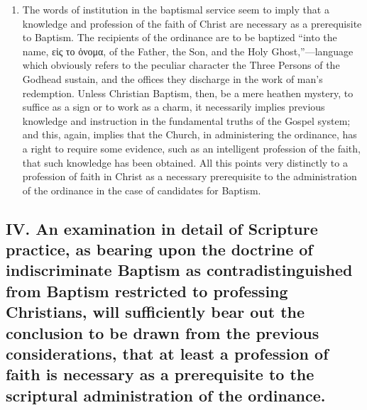 \documentclass[]{book}
\begin{document}
\begin{enumerate}
\item
  The words of institution in the baptismal service seem to imply that a knowledge and profession of the faith of Christ are necessary as a prerequisite to Baptism. The recipients of the ordinance are to be baptized ``into the name, εἰς το ὀνομα, of the Father, the Son, and the Holy Ghost,''---language which obviously refers to the peculiar character the Three Persons of the Godhead sustain, and the offices they discharge in the work of man's redemption. Unless Christian Baptism, then, be a mere heathen mystery, to suffice as a sign or to work as a charm, it necessarily implies previous knowledge and instruction in the fundamental truths of the Gospel system; and this, again, implies that the Church, in administering the ordinance, has a right to require some evidence, such as an intelligent profession of the faith, that such knowledge has been obtained. All this points very distinctly to a profession of faith in Christ as a necessary prerequisite to the administration of the ordinance in the case of candidates for Baptism.
\end{enumerate}

\hypertarget{iv.-an-examination-in-detail-of-scripture-practice-as-bearing-upon-the-doctrine-of-indiscriminate-baptism-as-contradistinguished-from-baptism-restricted-to-professing-christians-will-sufficiently-bear-out-the-conclusion-to-be-drawn-from-the-previous-considerations-that-at-least-a-profession-of-faith-is-necessary-as-a-prerequisite-to-the-scriptural-administration-of-the-ordinance.}{%
\subsection{IV. An examination in detail of Scripture practice, as bearing upon the doctrine of indiscriminate Baptism as contradistinguished from Baptism restricted to professing Christians, will sufficiently bear out the conclusion to be drawn from the previous considerations, that at least a profession of faith is necessary as a prerequisite to the scriptural administration of the ordinance.}\label{iv.-an-examination-in-detail-of-scripture-practice-as-bearing-upon-the-doctrine-of-indiscriminate-baptism-as-contradistinguished-from-baptism-restricted-to-professing-christians-will-sufficiently-bear-out-the-conclusion-to-be-drawn-from-the-previous-considerations-that-at-least-a-profession-of-faith-is-necessary-as-a-prerequisite-to-the-scriptural-administration-of-the-ordinance.}}
\end{document}

